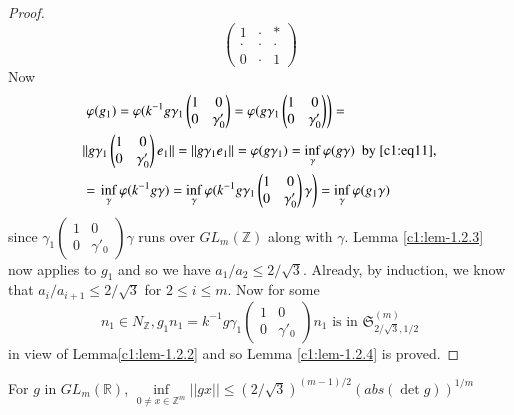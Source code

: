 \begin{proof}
$$\begin{pmatrix}
1 & \cdot & \ast\\
\cdot & \cdot & \cdot \\
0 & \cdot & 1
\end{pmatrix}
$$
Now
\begin{align*}
& \left.\varphi(g_{1})=\varphi(k^{-1}g\gamma_{1}
\begin{pmatrix}
1 & 0\\ 
0 & \gamma'_{0}
\end{pmatrix}
=\varphi(g\gamma_{1}
\begin{pmatrix}
1 & 0\\
0 & \gamma'_{0}
\end{pmatrix}
\right)=\\
& ||g\gamma_{1}
\begin{pmatrix}
1 & 0\\
0 & \gamma'_{0}
\end{pmatrix}
e_{1}||=||g\gamma_{1}e_{1}||=\varphi(g\gamma_{1})=\inf\limits_{\gamma}\varphi(g\gamma)\text{
  \  by \eqref{c1:eq11}},\\
&=
\left.\inf\limits_{\gamma}\varphi(k^{-1}g\gamma)=\inf\limits_{\gamma}\varphi(k^{-1}g\gamma_{1}
\begin{pmatrix}
1 & 0\\
0 & \gamma'_{0}
\end{pmatrix}
\gamma\right)=\inf\limits_{\gamma}\varphi(g_{1}\gamma) 
\end{align*}
since $\gamma_{1}\left(\begin{smallmatrix} 1 & 0\\ 0 & \gamma'_{0}
\end{smallmatrix}\right)\gamma$ runs over $GL_{m}(\mathbb{Z})$ along
with $\gamma$. Lemma \ref{c1:lem-1.2.3} now applies to $g_{1}$ and so we
have $a_{1}/a_{2}\leq 2/\sqrt{3}$. Already, by induction, we know that
$a_{i}/a_{i+1}\leq 2/\sqrt{3}$ for $2\leq i\leq m$. Now for some
$$
n_{1}\in N_{\mathbb{Z}}, g_{1}n_{1}=k^{-1}g\gamma_{1}
\begin{pmatrix}
1 & 0\\
0 & \gamma'_{0}
\end{pmatrix}
n_{1}\text{ \ is in \ } \mathfrak{S}^{(m)}_{2/\sqrt{3},1/2}
$$ 
in view of Lemma\pageoriginale \ref{c1:lem-1.2.2} and so Lemma
\ref{c1:lem-1.2.4} is proved. 
\end{proof}

\begin{coro*}
For $g$ in $GL_{m}(\mathbb{R})$, $\inf\limits_{0\neq x\in
  \mathbb{Z}^{m}}||gx||\leq (2/\sqrt{3})^{(m-1)/2}(abs(\det g))^{1/m}$
\end{coro*}

